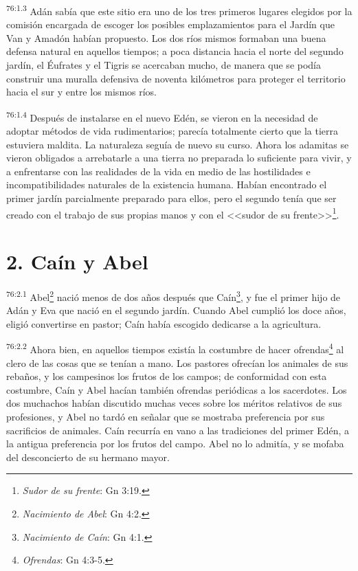 \par
\textsuperscript{76:1.3} Adán sabía que este sitio era uno de los tres primeros lugares elegidos por la comisión encargada de escoger los posibles emplazamientos para el Jardín que Van y Amadón habían propuesto. Los dos ríos mismos formaban una buena defensa natural en aquellos tiempos; a poca distancia hacia el norte del segundo jardín, el Éufrates y el Tigris se acercaban mucho, de manera que se podía construir una muralla defensiva de noventa kilómetros para proteger el territorio hacia el sur y entre los mismos ríos.

\par
\textsuperscript{76:1.4} Después de instalarse en el nuevo Edén, se vieron en la necesidad de adoptar métodos de vida rudimentarios; parecía totalmente cierto que la tierra estuviera maldita. La naturaleza seguía de nuevo su curso. Ahora los adamitas se vieron obligados a arrebatarle a una tierra no preparada lo suficiente para vivir, y a enfrentarse con las realidades de la vida en medio de las hostilidades e incompatibilidades naturales de la existencia humana. Habían encontrado el primer jardín parcialmente preparado para ellos, pero el segundo tenía que ser creado con el trabajo de sus propias manos y con el <<sudor de su frente>>\footnote{\textit{Sudor de su frente}: Gn 3:19.}.

\section*{2. Caín y Abel}
\par
\textsuperscript{76:2.1} Abel\footnote{\textit{Nacimiento de Abel}: Gn 4:2.} nació menos de dos años después que Caín\footnote{\textit{Nacimiento de Caín}: Gn 4:1.}, y fue el primer hijo de Adán y Eva que nació en el segundo jardín. Cuando Abel cumplió los doce años, eligió convertirse en pastor; Caín había escogido dedicarse a la agricultura.

\par
\textsuperscript{76:2.2} Ahora bien, en aquellos tiempos existía la costumbre de hacer ofrendas\footnote{\textit{Ofrendas}: Gn 4:3-5.} al clero de las cosas que se tenían a mano. Los pastores ofrecían los animales de sus rebaños, y los campesinos los frutos de los campos; de conformidad con esta costumbre, Caín y Abel hacían también ofrendas periódicas a los sacerdotes. Los dos muchachos habían discutido muchas veces sobre los méritos relativos de sus profesiones, y Abel no tardó en señalar que se mostraba preferencia por sus sacrificios de animales. Caín recurría en vano a las tradiciones del primer Edén, a la antigua preferencia por los frutos del campo. Abel no lo admitía, y se mofaba del desconcierto de su hermano mayor.

